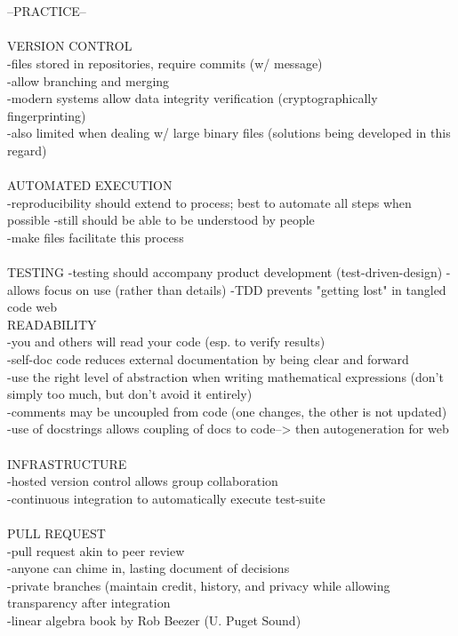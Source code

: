 \documentclass{report}
\begin{document}
\-\\
\-\\
--PRACTICE--\\
\-\\
VERSION CONTROL\\
-files stored in repositories, require commits (w/ message)\\
-allow branching and merging\\
-modern systems allow data integrity verification (cryptographically fingerprinting)\\
-also limited when dealing w/ large binary files (solutions being developed in this regard)\\ 
\-\\
AUTOMATED EXECUTION\\
-reproducibility should extend to process; best to automate all steps when possible
-still should be able to be understood by people\\
-make files facilitate this process\\
\-\\
TESTING
-testing should accompany product development (test-driven-design)
-allows focus on use (rather than details)
-TDD prevents "getting lost" in tangled code web
\-\\
READABILITY\\
-you and others will read your code (esp. to verify results)\\
-self-doc code reduces external documentation by being clear and forward\\
-use the right level of abstraction when writing mathematical expressions (don't simply too much, but don't avoid it entirely)\\
-comments may be uncoupled from code (one changes, the other is not updated)\\
-use of docstrings allows coupling of docs to code--> then autogeneration for web\\
\-\\
INFRASTRUCTURE\\
-hosted version control allows group collaboration\\
-continuous integration to automatically execute test-suite\\
\-\\
PULL REQUEST\\
-pull request akin to peer review\\
-anyone can chime in, lasting document of decisions\\
-private branches (maintain credit, history, and privacy while allowing transparency after integration\\

-linear algebra book by Rob Beezer (U. Puget Sound)
\end{document}
